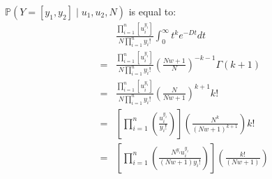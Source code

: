 \documentclass[11pt]{article}
\renewcommand{\Pr}{\mathbb{P}}
\begin{document}
$\Pr(Y=[y_1, y_2] \mid u_1, u_2, N)$ is equal to:
\begin{eqnarray*}
 & &  \frac{\prod_{i=1}^{n}\left[u_i^{y_i}\right]}{N\prod_{i=1}^{n} y_i!} 
\int_{0}^{\infty}  t^ke^{-D t} dt \\
& = & \frac{\prod_{i=1}^{n}\left[u_i^{y_i}\right]}{N\prod_{i=1}^{n} y_i!} \left(\frac{Nw + 1}{N}\right)^{-k-1}\Gamma(k+1) \\
& = &
\frac{\prod_{i=1}^{n}\left[u_i^{y_i}\right]}{N\prod_{i=1}^{n} y_i!} \left(\frac{N}{Nw + 1}\right)^{k+1} k! \\
& = &
\left[\prod_{i=1}^{n}\left(\frac{u_i^{y_i}}{y_i!}\right)\right] \left(\frac{N^k}{(Nw + 1)^{k+1}}\right) k! \\
& = &
\left[\prod_{i=1}^{n}\left(\frac{N^{y_i}u_i^{y_i}}{(Nw + 1)y_i!}\right)\right] \left(\frac{k!}{(Nw + 1)}\right) \\
\end{eqnarray*}
\end{document}
